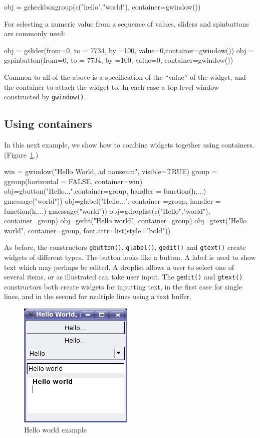 \documentclass[12pt]{article}
\newcommand{\RFunc}[1]{\texttt{#1()}}
\begin{document}
\begin{Scode}
  obj = gcheckboxgroup(c("hello","world"), container=gwindow())
\end{Scode}



For selecting a numeric value from a sequence of values, sliders and
spinbuttons are commonly used:
\begin{Scode}
  obj = gslider(from=0, to = 7734, by =100, value=0,container=gwindow())
  obj = gspinbutton(from=0, to = 7734, by =100, value=0, container=gwindow())
\end{Scode}

Common to all of the above is a specification of the ``value'' of the
widget, and the container to attach the widget to. In each case a
top-level window constructed by \RFunc{gwindow}.

\subsection{Using containers}

In this next example, we show how to  combine widgets together using
containers. (Figure~\ref{fig:hello-world}.)


\begin{Scode}
  win = gwindow("Hello World, ad nauseum", visible=TRUE)
  group = ggroup(horizontal = FALSE, container=win)
  obj=gbutton("Hello...",container=group, handler = function(h,...) gmessage("world"))
  obj=glabel("Hello...", container =group, handler = function(h,...) gmessage("world"))
  obj=gdroplist(c("Hello","world"), container=group)
  obj=gedit("Hello world", container=group)
  obj=gtext("Hello world", container=group, font.attr=list(style="bold"))
\end{Scode}


As before, the constructors \RFunc{gbutton}, \RFunc{glabel},
\RFunc{gedit} and \RFunc{gtext} create widgets of different types.
The button looks like a button. A label is used to show text which may
perhaps be edited. A droplist allows a user to select one of several
items, or as illustrated can take user input. The \RFunc{gedit} and
\RFunc{gtext} constructors both create widgets for inputting text, in
the first case for single lines, and in the second for multiple lines
using a text buffer.

\begin{figure}[htbp]
  \centering
  \includegraphics[width=.35\textwidth]{hello-world}
  \caption{Hello world example}
  \label{fig:hello-world}
\end{figure}
\end{document}
